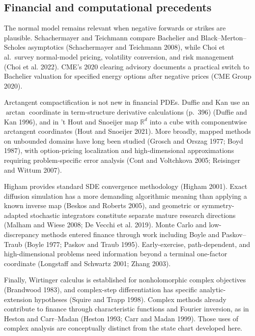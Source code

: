 \documentclass[
  english,
  10pt,
  letterpaper,
  DIV=11,
  numbers=noendperiod]{scrartcl}
\theoremstyle{definition}
\theoremstyle{plain}
\theoremstyle{plain}
\theoremstyle{remark}
\begin{document}
\subsection{Financial and computational
precedents}\label{financial-and-computational-precedents}

The normal model remains relevant when negative forwards or strikes are
plausible. Schachermayer and Teichmann compare Bachelier and
Black--Merton--Scholes asymptotics (Schachermayer and Teichmann 2008),
while Choi et al.~survey normal-model pricing, volatility conversion,
and risk management (Choi et al. 2022). CME's 2020 clearing advisory
documents a practical switch to Bachelier valuation for specified energy
options after negative prices (CME Group 2020).

Arctangent compactification is not new in financial PDEs. Duffie and Kan
use an \(\arctan\) coordinate in term-structure derivative calculations
(p.~396) (Duffie and Kan 1996), and in 't Hout and Snoeijer map
\(\mathbb R^d\) into a cube with componentwise arctangent coordinates
(Hout and Snoeijer 2021). More broadly, mapped methods on unbounded
domains have long been studied (Grosch and Orszag 1977; Boyd 1987), with
option-pricing localization and high-dimensional approximations
requiring problem-specific error analysis (Cont and Voltchkova 2005;
Reisinger and Wittum 2007).

Higham provides standard SDE convergence methodology (Higham 2001).
Exact diffusion simulation has a more demanding algorithmic meaning than
applying a known inverse map (Beskos and Roberts 2005), and geometric or
symmetry-adapted stochastic integrators constitute separate mature
research directions (Malham and Wiese 2008; De Vecchi et al. 2019).
Monte Carlo and low-discrepancy methods entered finance through work
including Boyle and Paskov--Traub (Boyle 1977; Paskov and Traub 1995).
Early-exercise, path-dependent, and high-dimensional problems need
information beyond a terminal one-factor coordinate (Longstaff and
Schwartz 2001; Zhang 2003).

Finally, Wirtinger calculus is established for nonholomorphic complex
objectives (Brandwood 1983), and complex-step differentiation has
specific analytic-extension hypotheses (Squire and Trapp 1998). Complex
methods already contribute to finance through characteristic functions
and Fourier inversion, as in Heston and Carr--Madan (Heston 1993; Carr
and Madan 1999). Those uses of complex analysis are conceptually
distinct from the state chart developed here.
\end{document}

